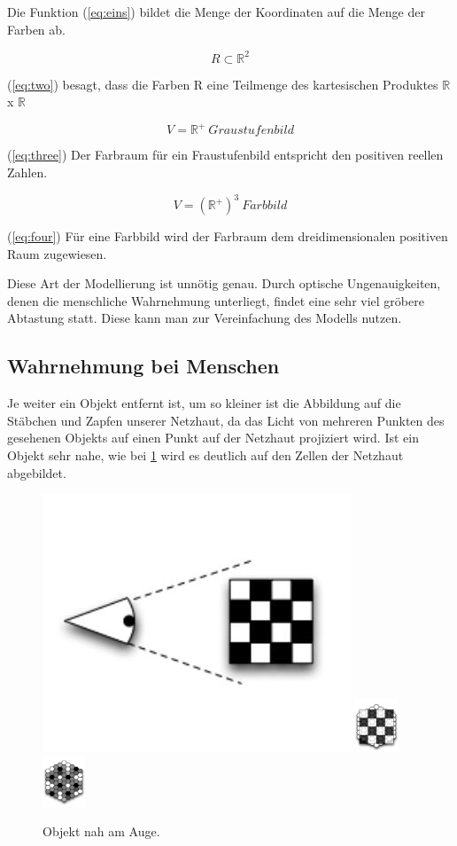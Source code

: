 Die Funktion (\ref{eq:eins}) bildet die Menge der Koordinaten auf die Menge der Farben ab.

\begin{equation}\label{eq:two}R\subset \mathbb{R}^2\end{equation}

(\ref{eq:two}) besagt, dass die Farben R eine Teilmenge des  kartesischen Produktes  $\mathbb{R}$ x $\mathbb{R}$

\begin{equation}\label{eq:three}V = \mathbb{R}^+ \: Graustufenbild\end{equation}

(\ref{eq:three}) Der Farbraum für ein Fraustufenbild entspricht den positiven reellen Zahlen.

\begin{equation}\label{eq:four}V = \left (\mathbb{R}^+  \right )^3 \: Farbbild\end{equation}

(\ref{eq:four}) Für eine Farbbild wird der Farbraum dem dreidimensionalen positiven Raum zugewiesen.


Diese Art der Modellierung ist unnötig genau. Durch optische Ungenauigkeiten, denen die menschliche Wahrnehmung unterliegt, findet eine sehr viel gröbere Abtastung statt. Diese kann man zur Vereinfachung des Modells nutzen.

\subsection{Wahrnehmung bei Menschen}
Je weiter ein Objekt entfernt ist, um so kleiner ist die Abbildung auf die Stäbchen und Zapfen unserer Netzhaut, da das Licht von mehreren Punkten des gesehenen Objekts auf einen Punkt auf der Netzhaut projiziert wird. Ist ein Objekt sehr nahe, wie bei \ref{fig:Objekt nah am Auge} wird es deutlich auf den Zellen der Netzhaut abgebildet.

\begin{figure}[ht]
  \centering
  \includegraphics[width=.75in]{images/AugeObjektNah}
  \includegraphics[width=0.5in]{images/SinneszelleObjektNah}
  \includegraphics[width=0.5in]{images/AbbildungAufSinneszelleObjektNah}
  \caption{Objekt nah am Auge.}
  \label{fig:Objekt nah am Auge}
  \cite{rehfeld}
\end{figure}

